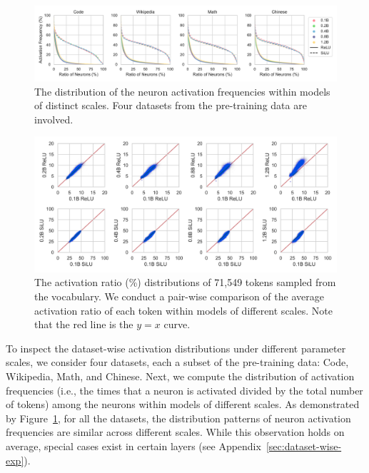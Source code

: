 \documentclass{article} %
\begin{document}
\begin{figure}[ht]
    \centering
    \includegraphics[width=\linewidth]{figures/task-dist.pdf}
    \caption{The distribution of the neuron activation frequencies within models of distinct scales. Four datasets from the pre-training data are involved.}
    \label{fig:task-dist}
\vspace{-1em}
\end{figure}
\begin{figure}[ht]
    \centering
    \includegraphics[width=\linewidth]{figures/token-dist.jpg}
    \caption{The activation ratio (\%) distributions of 71,549 tokens sampled from the vocabulary. We conduct a pair-wise comparison of the average activation ratio of each token within models of different scales. Note that the red line is the $y=x$ curve.}
    \label{fig:token-dist}
\vspace{-1em}
\end{figure}

To inspect the dataset-wise activation distributions under different parameter scales, we consider four datasets, each a subset of the pre-training data: Code, Wikipedia, Math, and Chinese. Next, we compute the distribution of activation frequencies (i.e., the times that a neuron is activated divided by the total number of tokens) among the neurons within models of different scales. As demonstrated by Figure~\ref{fig:task-dist}, for all the datasets, the distribution patterns of neuron activation frequencies are similar across different scales. While this observation holds on average, special cases exist in certain layers (see Appendix~\ref{sec:dataset-wise-exp}).
\end{document}
